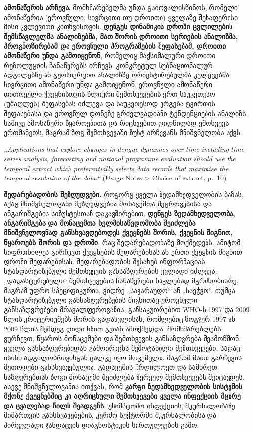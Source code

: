 \documentclass[11pt,a4paper]{article}
\newcommand{\imp}[1]{\textbf{\color{importred}#1}}
\begin{document}
\textbf{ამონაწერის არჩევა.} მომხმარებელმა უნდა გაითვალისწინოს, რომელი ამონაწერია (ეროვნული, სივრცითი თუ დროითი) ყველაზე
შესაფერისი მისი კვლევითი კითხვისთვის. \imp{დენგეს დინამიკის დროში ცვლილების შემსწავლელმა ანალიზებმა, მათ შორის დროითი სერიების
ანალიზმა, პროგნოზირებამ და ეროვნული პროგრამების შეფასებამ, დროითი ამონაწერი უნდა გამოიყენონ}, რომელიც მაქსიმალური დროითი
რეზოლუციის ჩანაწერებს ირჩევს. კონკრეტულ სუბნაციონალურ ადგილებზე ან გეოსივრცით ანალიზზე ორიენტირებულმა კვლევებმა სივრცითი
ამონაწერი უნდა გამოიყენონ. ეროვნული ამონაწერი თითოეული ქვეყნისთვის წლიური შემთხვევების ერთ საუკეთესო (უმაღლეს) შეფასებას იძლევა
და საუკეთესოდ ერგება ტვირთის შეფასებასა და ეროვნულ დონეზე გრძელვადიანი ტენდენციების ანალიზს. სამივე ამონაწერი წყაროებითა და
რიცხვებით დიდწილად ემთხვევა ერთმანეთს, მაგრამ ზოგ შემთხვევაში ზუსტ არჩევანს მნიშვნელობა აქვს.

\begin{citat}
\textit{„Applications that explore changes in dengue dynamics over time including time series analysis, forecasting and national programme evaluation should use the temporal extract which preferentially selects data records that maximise the temporal resolution of the data.“} (Usage Notes > Choice of extract, p.~10)
\end{citat}

\textbf{შედარებადობის შეზღუდვები.} როგორც ყველა ზედამხედველობის ბაზას, აქაც მნიშვნელოვანი შეზღუდვებია მონაცემთა შეგროვებისა და
ანგარიშგების სიზუსტესთან დაკავშირებით. \imp{დენგეს ზედამხედველობა, ანგარიშგება და მონაცემთა ხელმისაწვდომობა შეიძლება მნიშვნელოვნად
განსხვავდებოდეს ქვეყნებს შორის, ქვეყნის შიგნით, წყაროებს შორის და დროში}, რაც შედარებადობაზე მოქმედებს. ამიტომ სიფრთხილეს
გირჩევთ ქვეყნების შედარებისას ან ერთი ქვეყნის შიგნით დროში შედარებისას. შედარებადობის შესახებ ინფორმაციას სტანდარტიზებული შემთხვევის
განსაზღვრების ცვლადი იძლევა: „დადასტურებული“ შემთხვევების ჩანაწერები ნაკლებად მგრძნობიარე, მაგრამ უფრო სპეციფიკურია, ვიდრე
„სავარაუდო“ ან „საეჭვო“. თუმცა სტანდარტიზებული განსაზღვრებების შიგნითაც ეროვნული განსაზღვრებები მრავალფეროვანია, განსაკუთრებით
WHO-ს 1997 და 2009 წლის კრიტერიუმებს შორის გადასვლისას, რომლებიც ზოგჯერ 1997 ან 2009 წლის შემდეგ დიდი ხნით გვიან ამოქმედდა.
მომხმარებლებს ვურჩევთ, წყაროს მონაცემები და შემთხვევის განსაზღვრება შეამოწმონ. ყველა განსაზღვრებიდან გამოირიცხა შემოტანილი
შემთხვევები, სადაც ისინი ადგილობრივისგან ცალკე იყო მოცემული, მაგრამ მათი გარჩევის მეთოდები განსხვავებულია. გადაცემის
ჩრდილოეთ და სამხრეთ საზღვრებთან ზოგი მონაცემი შეიძლება შერეულ შემთხვევებს შეიცავდეს. ასევე მნიშვნელოვანია ითქვას, რომ \imp{კარგი
ზედამხედველობის სისტემის მქონე ქვეყნებშიც კი აღრიცხული შემთხვევები ყველა ინფექციის მცირე და ცვალებად წილს შეადგენს}: უსიმპტომო
ინფექციის, მკურნალობაზე მიმართვის განსხვავებების, კერძო სექტორში მკურნალობისა და პირველადი ჯანდაცვის დიაგნოსტიკის სირთულეების გამო.
\end{document}
